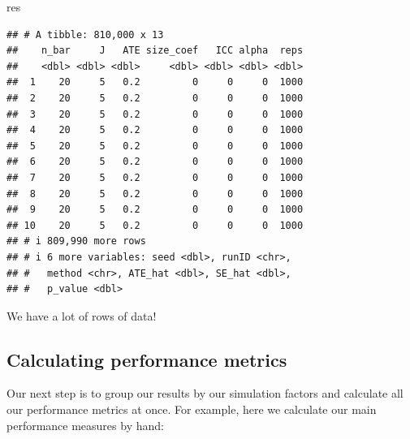 \documentclass[
]{book}
\newenvironment{Shaded}{\begin{snugshade}}{\end{snugshade}}
\newcommand{\NormalTok}[1]{#1}
\begin{document}
\begin{Shaded}
\begin{Highlighting}[]
\NormalTok{res}
\end{Highlighting}
\end{Shaded}

\begin{verbatim}
## # A tibble: 810,000 x 13
##    n_bar     J   ATE size_coef   ICC alpha  reps
##    <dbl> <dbl> <dbl>     <dbl> <dbl> <dbl> <dbl>
##  1    20     5   0.2         0     0     0  1000
##  2    20     5   0.2         0     0     0  1000
##  3    20     5   0.2         0     0     0  1000
##  4    20     5   0.2         0     0     0  1000
##  5    20     5   0.2         0     0     0  1000
##  6    20     5   0.2         0     0     0  1000
##  7    20     5   0.2         0     0     0  1000
##  8    20     5   0.2         0     0     0  1000
##  9    20     5   0.2         0     0     0  1000
## 10    20     5   0.2         0     0     0  1000
## # i 809,990 more rows
## # i 6 more variables: seed <dbl>, runID <chr>,
## #   method <chr>, ATE_hat <dbl>, SE_hat <dbl>,
## #   p_value <dbl>
\end{verbatim}

We have a lot of rows of data!

\subsection{Calculating performance metrics}\label{calculating-performance-metrics}

Our next step is to group our results by our simulation factors and calculate all our performance metrics at once.
For example, here we calculate our main performance measures by hand:
\end{document}
